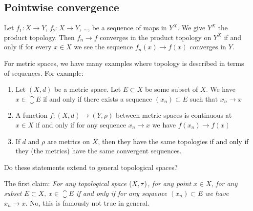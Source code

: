 \subsection{Pointwise convergence}

\begin{theorem}
Let $f_{1}\colon X\to Y$, $f_{2}\colon X\to Y$, \dots, be a sequence
of maps in $Y^{X}$. We give $Y^{X}$ the product topology. Then
$f_{n}\to f$ converges in the product topology on $Y^{X}$ if and only
if for every $x\in X$ we see the sequence $f_{n}(x)\to f(x)$ converges
in $Y$.
\end{theorem}

\begin{aside}
For metric spaces, we have many examples where topology is described
in terms of sequences. For example:
\begin{enumerate}
\item Let $(X,d)$ be a metric space. Let $E\subset X$ be some subset
  of $X$. We have $x\in\closure{E}$ if and only if there exists a
  sequence $(x_{n})\subset E$ such that $x_{n}\to x$
\item A function $f\colon(X,d)\to(Y,\rho)$ between metric spaces is
  continuous at $x\in X$ if and only if for any sequence $x_{n}\to x$
  we have $f(x_{n})\to f(x)$
\item If $d$ and $\rho$ are metrics on $X$, then they have the same
  topologies if and only if they (the metrics) have the same
  convergent sequences.
\end{enumerate}
Do these statements extend to general topological spaces?
\end{aside}

\begin{example}
The first claim: \textit{For any topological space $(X,\tau)$, for any
  point $x\in X$, for any subset $E\subset X$, $x\in\closure{E}$ if
  and only if for any sequence $(x_{n})\subset E$ we have $x_{n}\to x$}.
No, this is famously not true in general.
\end{example}

